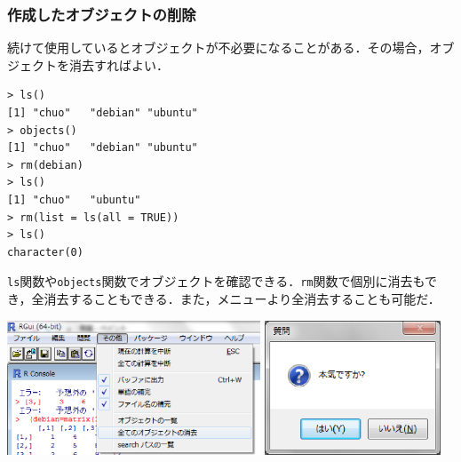 \subsubsection{作成したオブジェクトの削除}
続けて使用しているとオブジェクトが不必要になることがある．その場合，オブジェクトを消去すればよい．
\begin{breakbox}
\begin{verbatim}
> ls()
[1] "chuo"   "debian" "ubuntu"
> objects()
[1] "chuo"   "debian" "ubuntu"
> rm(debian)
> ls()
[1] "chuo"   "ubuntu"
> rm(list = ls(all = TRUE))
> ls()
character(0)
\end{verbatim}
\end{breakbox}
{\tt ls}関数や{\tt objects}関数でオブジェクトを確認できる．{\tt rm}関数で個別に消去もでき，全消去することもできる．また，メニューより全消去することも可能だ．

\includegraphics[height=4cm]{img/windows/rmall.eps}\hspace{0.8em} \includegraphics[height=4cm]{img/windows/honki.eps}
